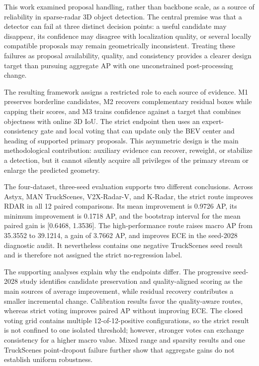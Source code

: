 \documentclass[preprint,12pt,times]{elsarticle}
\begin{document}
This work examined proposal handling, rather than backbone scale, as a source
of reliability in sparse-radar 3D object detection. The central premise was
that a detector can fail at three distinct decision points: a useful candidate
may disappear, its confidence may disagree with localization quality, or
several locally compatible proposals may remain geometrically inconsistent.
Treating these failures as proposal availability, quality, and consistency
provides a clearer design target than pursuing aggregate AP with one
unconstrained post-processing change.

The resulting framework assigns a restricted role to each source of evidence.
M1 preserves borderline candidates, M2 recovers complementary residual boxes
while capping their scores, and M3 trains confidence against a target that
combines objectness with online 3D IoU. The strict endpoint then uses an
expert-consistency gate and local voting that can update only the BEV center
and heading of supported primary proposals. This asymmetric design is the main
methodological contribution: auxiliary evidence can recover, reweight, or
stabilize a detection, but it cannot silently acquire all privileges of the
primary stream or enlarge the predicted geometry.

The four-dataset, three-seed evaluation supports two different conclusions.
Across Astyx, MAN TruckScenes, V2X-Radar-V, and K-Radar, the strict route
improves RDAR in all 12 paired comparisons. Its mean improvement is 0.9726 AP,
its minimum improvement is 0.1718 AP, and the bootstrap interval for the mean
paired gain is [0.6468, 1.3536]. The high-performance route raises macro AP
from 35.3552 to 39.1214, a gain of 3.7662 AP, and improves ECE in the
seed-2028 diagnostic audit. It nevertheless contains one negative
TruckScenes seed result and is therefore not assigned the strict
no-regression label.

The supporting analyses explain why the endpoints differ. The progressive
seed-2028 study identifies candidate preservation and quality-aligned scoring
as the main sources of average improvement, while residual recovery contributes
a smaller incremental change. Calibration results favor the quality-aware
routes, whereas strict voting improves paired AP without improving ECE. The
closed voting grid contains multiple 12-of-12-positive configurations, so the
strict result is not confined to one isolated threshold; however, stronger
votes can exchange consistency for a higher macro value. Mixed range and
sparsity results and one TruckScenes point-dropout failure further show that
aggregate gains do not establish uniform robustness.
\end{document}
